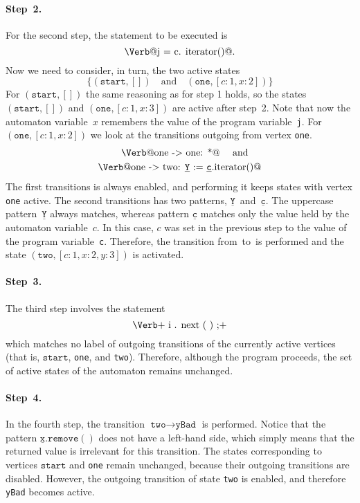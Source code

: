 \documentclass[10pt, preprint]{sigplanconf} %
\makeatletter
\newcommand{\pattern}[1]{\ensuremath{\mathtt{\underline{#1}}}}
\newcommand{\start}{\ensuremath{\mathtt{start}}\xspace}
\newcommand{\verbline}[2][]{\[\text{\Verb@#2@}#1\]}
\makeatother
\begin{document}
\paragraph{Step~2.}
For the second step, the statement to be executed is \verbline[.]{j = c.\PY{n+na}{iterator}()}
Now we need to consider, in turn, the two active states \[\{(\start,[])\quad\text{and}\quad(\texttt{one},[c:1,x:2])\}\]
For $(\start,[])$ the same reasoning as for step 1 holds, so the states $(\start,[])$ and $(\mathtt{one},[c:1,x:3])$ are active after step~2.
Note that now the automaton variable~$x$ remembers the value of the program variable~{\tt j}.
For $(\texttt{one},[c:1,x:2])$ we look at the transitions outgoing from vertex {\tt one}.
\begin{align*}
\text{\Verb@one -> one: *@} \quad \mbox{ and } \quad \\
\text{\Verb@one -> two: \pattern Y := \pattern c.iterator()@}
\end{align*}
The first transitions is always enabled, and performing it keeps states with vertex \texttt{one} active.
The second transitions has two patterns, \pattern Y~and~\pattern c.
The uppercase pattern~\pattern Y always matches, whereas
pattern \pattern c matches only the value held by the automaton variable~$c$.
In this case, $c$ was set in the previous step to the value of the program variable~\texttt{c}.
Therefore, the transition from~\Verb@one@ to~\Verb@two@ is performed and the state $(\mathtt{two},[c:1,x:2,y:3])$ is activated.

\paragraph{Step~3.}

The third step involves the statement
\[\text{\Verb+\PY{n}{i}\PY{o}{.}\PY{n+na}{next}\PY{o}{(}\PY{o}{)}\PY{o}{;}+}\]
which matches no label of outgoing transitions of the currently active vertices (that is, \start, {\tt one}, and {\tt  two}).
Therefore, although the program proceeds, the set of active states of the automaton remains unchanged.

\paragraph{Step~4.}

In the fourth step, the transition $\texttt{two}\to\texttt{yBad}$ is performed.
Notice that the pattern $\pattern{x}.\mathtt{remove}()$ does not have a left-hand side, which simply means that the returned value is irrelevant for this transition.
The states corresponding to vertices \start and {\tt one} remain unchanged, because their outgoing transitions are disabled.
However,  the outgoing transition of state {\tt two} is enabled, and therefore {\tt yBad} becomes active.
\end{document}
